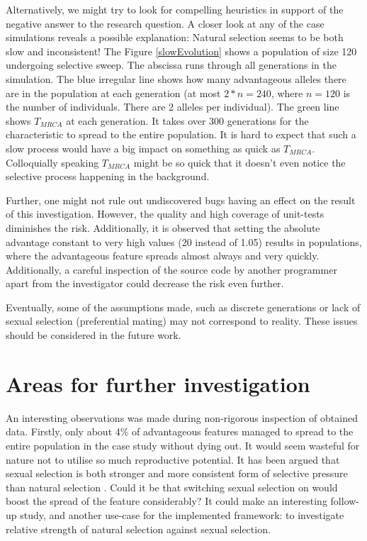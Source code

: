 \documentclass{l4proj}
\begin{document}
Alternatively, we might try to look for compelling heuristics in support of the negative answer to the research question. A closer look at any of the case simulations reveals a possible explanation: Natural selection seems to be both slow and inconsistent! The Figure \ref{slowEvolution} shows a population of size 120 undergoing selective sweep. The abscissa runs through all generations in the simulation. The blue irregular line shows how many advantageous alleles there are in the population at each generation (at most $2*n=240$, where $n=120$ is the number of individuals. There are 2 alleles per individual). The green line shows $T_{MRCA}$ at each generation. It takes over 300 generations for the characteristic to spread to the entire population. It is hard to expect that such a slow process would have a big impact on something as quick as $T_{MRCA}$. Colloquially speaking $T_{MRCA}$ might be so quick that it doesn't even notice the selective process happening in the background.

Further, one might not rule out undiscovered bugs having an effect on the result of this investigation. However, the quality and high coverage of unit-tests diminishes the risk. Additionally, it is observed that setting the absolute advantage constant to very high values (20 instead of 1.05) results in populations, where the advantageous feature spreads almost always and very quickly. Additionally, a careful inspection of the source code by another programmer apart from the investigator could decrease the risk even further.

Eventually, some of the assumptions made, such as discrete generations or lack of sexual selection (preferential mating) may not correspond to reality. These issues should be considered in the future work.

\section{Areas for further investigation}

\begin{samepage}

An interesting observations was made during non-rigorous inspection of obtained data. Firstly, only about 4\% of advantageous features managed to spread to the entire population in the case study without dying out. It would seem wasteful for nature not to utilise so much reproductive potential. It has been argued that sexual selection is both stronger and more consistent form of selective pressure than natural selection \parencite{Miller14}. Could it be that switching sexual selection on would boost the spread of the feature considerably? It could make an interesting follow-up study, and another use-case for the implemented framework: to investigate relative strength of natural selection against sexual selection.

\end{samepage}

\printglossaries


\begingroup
\sloppy
\printbibliography[heading=bibintoc]
\endgroup

\end{document}

